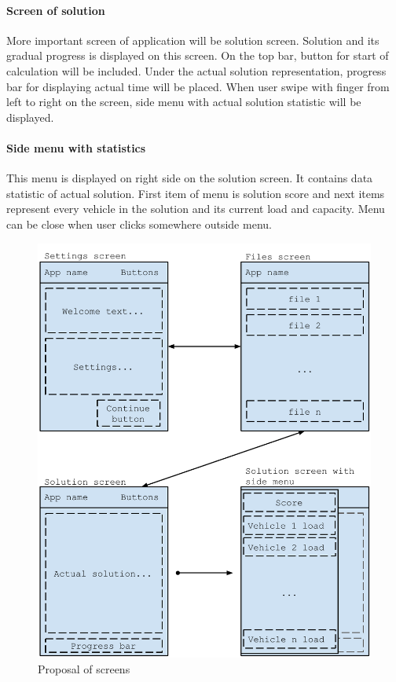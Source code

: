 \paragraph{Screen of solution}
More important screen of application will be solution screen. Solution and its gradual progress is displayed on this
screen. On the top bar, button for start of calculation will be included. Under the actual solution representation,
progress bar for displaying actual time will be placed. When user swipe with finger from left to right on the screen,
side menu with actual solution statistic will be displayed.

\paragraph{Side menu with statistics}
This menu is displayed on right side on the solution screen. It contains data statistic of actual solution. First item
of menu is solution score and next items represent every vehicle in the solution and its current load and capacity.
Menu can be close when user clicks somewhere outside menu.

\begin{figure}[h!]
    \centering
    \includegraphics[scale=0.8]{fig/proposal.pdf}
    \caption{Proposal of screens}
    \label{proposalFig}
\end{figure}

